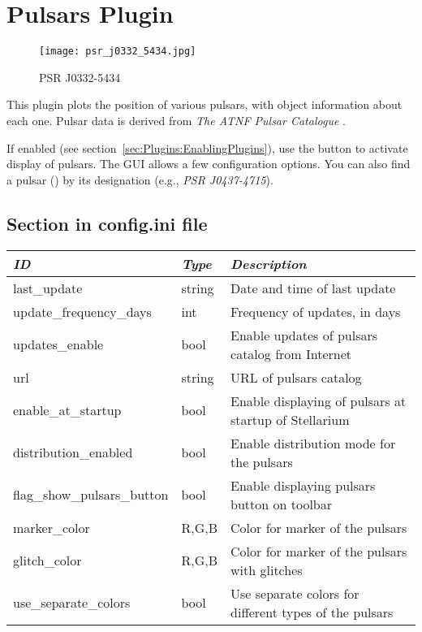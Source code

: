 \newpage

\section{Pulsars Plugin}
\label{sec:plugins:Pulsars}

\begin{figure}[ht]
\texttt{[image: psr\_j0332\_5434.jpg]}
\label{fig:plugin:Pulsars}
\caption{PSR J0332-5434}
\end{figure}

\noindent This plugin plots the position of various pulsars, with object
information about each one. Pulsar data is derived from \textit{The
  ATNF Pulsar Catalogue} \cite{2005AJ....129.1993M}.

If enabled (see section~\ref{sec:Plugins:EnablingPlugins}), use the
 button to activate display of
pulsars. The GUI allows a few configuration options.  You can also
find a pulsar () by its designation (e.g., \emph{PSR
  J0437-4715}).



\subsection{Section  in config.ini file}
\label{sec:plugins:Pulsars:config}

\begin{longtabu} to \textwidth {l|l|X}\toprule
\emph{ID}               & \emph{Type} & \emph{Description}\\\midrule
last\_update                & string & Date and time of last update\\\midrule
update\_frequency\_days     & int    & Frequency of updates, in days\\\midrule
updates\_enable             & bool   & Enable updates of pulsars catalog from Internet \\\midrule
url                         & string & URL of pulsars catalog \\\midrule
enable\_at\_startup         & bool   & Enable displaying of pulsars at startup of Stellarium \\\midrule
distribution\_enabled       & bool   & Enable distribution mode for the pulsars \\\midrule
flag\_show\_pulsars\_button & bool   & Enable displaying pulsars button on toolbar \\\midrule
marker\_color               & R,G,B  & Color for marker of the pulsars \\\midrule
glitch\_color               & R,G,B  & Color for marker of the pulsars with glitches \\\midrule
use\_separate\_colors       & bool   & Use separate colors for different types of the pulsars \\\bottomrule
\end{longtabu}

